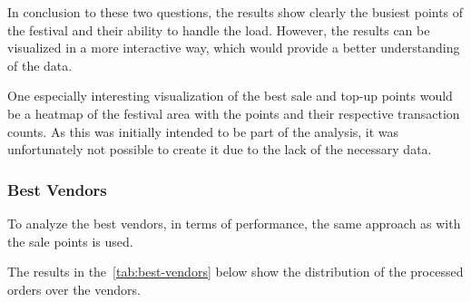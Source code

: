 In conclusion to these two questions, the results show clearly the busiest points of the festival and their ability to handle the load.
However, the results can be visualized in a more interactive way, which would provide a better understanding of the data.

One especially interesting visualization of the best sale and top-up points would be a heatmap of the festival area with the points and their respective transaction counts.
As this was initially intended to be part of the analysis, it was unfortunately not possible to create it due to the lack of the necessary data.


\subsubsection{Best Vendors}
\label{subsubsec:analysis-best-vendors}

To analyze the best vendors, in terms of performance, the same approach as with the sale points is used.


The results in the~\autoref{tab:best-vendors} below show the distribution of the processed orders over the vendors.


